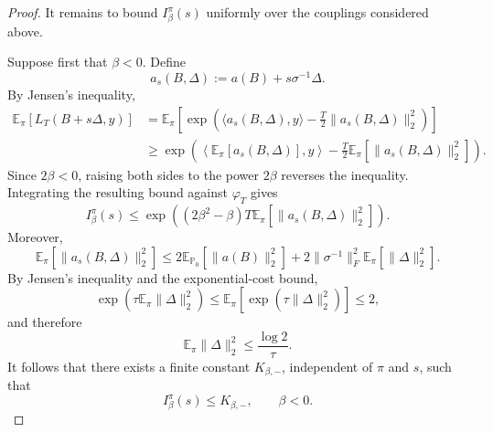 \documentclass[11pt]{article}
\theoremstyle{definition}
\newcommand{\E}{\mathbb{E}}
\begin{document}
\begin{proof}
It remains to bound $I_\beta^\pi(s)$ uniformly over the couplings
considered above.

Suppose first that $\beta<0$. Define
\[
a_s(B,\Delta)
:=
a(B)+s\sigma^{-1}\Delta.
\]
By Jensen's inequality,
\begin{align*}
\E_\pi[L_T(B+s\Delta,y)]
&=
\E_\pi
\left[
\exp\!\left(
\langle a_s(B,\Delta),y\rangle
-
\frac{T}{2}\|a_s(B,\Delta)\|_2^2
\right)
\right] \\
&\geq
\exp\!\left(
\left\langle
\E_\pi[a_s(B,\Delta)],y
\right\rangle
-
\frac{T}{2}
\E_\pi
\left[
\|a_s(B,\Delta)\|_2^2
\right]
\right).
\end{align*}
Since $2\beta<0$, raising both sides to the power $2\beta$ reverses the
inequality. Integrating the resulting bound against $\varphi_T$ gives
\[
I_\beta^\pi(s)
\leq
\exp\!\left(
(2\beta^2-\beta)T
\E_\pi
\left[
\|a_s(B,\Delta)\|_2^2
\right]
\right).
\]
Moreover,
\[
\E_\pi
\left[
\|a_s(B,\Delta)\|_2^2
\right]
\leq
2\E_{\mathbb P_0}
\left[
\|a(B)\|_2^2
\right]
+
2\|\sigma^{-1}\|_F^2
\E_\pi
\left[
\|\Delta\|_2^2
\right].
\]
By Jensen's inequality and the exponential-cost bound,
\[
\exp\!\left(
\tau\E_\pi\|\Delta\|_2^2
\right)
\leq
\E_\pi
\left[
\exp\!\left(
\tau\|\Delta\|_2^2
\right)
\right]
\leq 2,
\]
and therefore
\[
\E_\pi\|\Delta\|_2^2
\leq
\frac{\log 2}{\tau}.
\]
It follows that there exists a finite constant $K_{\beta,-}$,
independent of $\pi$ and $s$, such that
\begin{equation}\label{eq:Ibeta-negative-uniform}
I_\beta^\pi(s)
\leq
K_{\beta,-},
\qquad
\beta<0.
\end{equation}


\end{proof}
\end{document}
